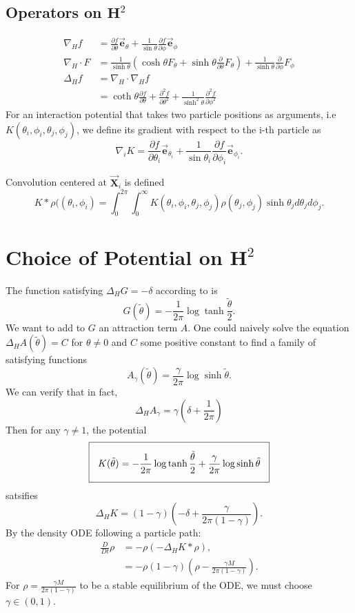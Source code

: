 \documentclass{article}
\newcommand{\p}{\partial}
\newcommand{\h}{\theta}
\newcommand{\hi}{\theta_i}
\newcommand{\hj}{\theta_j}
\newcommand{\eh}{\vec{\mathbf{e}}_\theta}
\newcommand{\ep}{\vec{\mathbf{e}}_\phi}
\newcommand{\ehi}{\vec{\mathbf{e}}_{\theta_i}}
\newcommand{\epi}{\vec{\mathbf{e}}_{\phi_i}}
\newcommand{\X}{\vec{\mathbf{X}}}
\begin{document}
\subsection{Operators on $\mathbf{H}^2$}
\begin{align*}
\nabla_H f &= \frac{\p f}{\p \h} \eh + \frac{1}{\sin{\h}} \frac{\p f}{\p \phi} \ep \\
\nabla_H \cdot F &=\frac{1}{\sinh{\h}} \left(\cosh{\h} F_\h + \sinh{\h}\frac{\p}{\p\h} F_\h  \right) + \frac{1}{\sinh{\h}} \frac{\p}{\p \phi}F_\phi \\
\Delta_H f &= \nabla_H \cdot \nabla_H f \\
&= \coth{\h} \frac{\p f}{\p \h} + \frac{\p^2 f}{\p \h^2} + \frac{1}{\sinh^2{\h}} \frac{\p^2 f}{\p \phi^2} 
\end{align*}
For an interaction potential that takes two particle positions as arguments, i.e $K(\hi,\phi_i,\hj,\phi_j)$, we define its gradient with respect to the i-th particle as
\[
\nabla_i K = \frac{\p f}{\p \hi} \ehi + \frac{1}{\sin{\hi}} \frac{\p f}{\p \phi_i} \epi.
\]

Convolution centered at $\X_i$ is defined
\[
K * \rho ((\hi,\phi_i) = \int_{0}^{2\pi} \int_{0}^{\infty} K(\hi, \phi_i, \hj, \phi_j) \rho(\hj,\phi_j) \sinh{\hj} d\hj d\phi_j.
\]

\section{Choice of Potential on $\mathbf{H}^2$}

The function satisfying $\Delta_H G = -\delta$ according to \cite{kimura} is
\[
G( \tilde{\h} ) = - \frac{1}{2\pi} \log{ \tanh{\frac{\tilde{\h}}{2}}}.
\]
We want to add to $G$ an attraction term $A$. One could naively solve the equation $\Delta_H A(\tilde{\h}) = C$ for $\h \neq 0$ and $C$ some positive constant to find a family of satisfying functions
\[
A_\gamma(\tilde{\h}) = \frac{\gamma}{2\pi} \log{ \sinh{ \tilde{\h}}}.
\]
We can verify that in fact,
\[
\Delta_H A_\gamma = \gamma \left( \delta + \frac{1}{2\pi} \right)
\]
Then for any $\gamma \neq 1$, the potential
\[
\setlength{\fboxsep}{3\fboxsep}\boxed{
K(\tilde{\h}) = -\frac{1}{2\pi} \log{ \tanh{ \frac{\tilde{\h}}{2}}} + \frac{\gamma}{2\pi} \log{ \sinh{ \tilde{\h}}}
}
\]
satsifies 
\[
\Delta_H K = (1-\gamma)\left( -\delta + \frac{\gamma}{2\pi(1-\gamma)} \right).
\]
By the density ODE following a particle path:
\begin{align}
\frac{D}{Dt} \rho
&=-\rho (-\Delta_H K * \rho),\label{approach}\\
&=-\rho (1-\gamma) \left( \rho - \frac{\gamma M}{2\pi (1-\gamma)}\right).
\end{align}
For $\rho = \frac{\gamma M}{2\pi (1-\gamma)}$ to be a stable equilibrium of the ODE, we must choose $\gamma \in (0,1)$.
\end{document}
